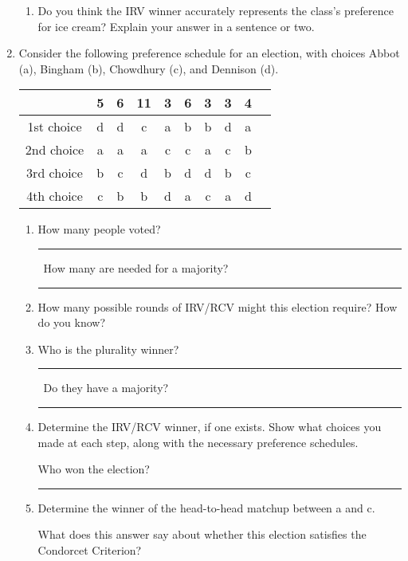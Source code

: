 \documentclass[12pt]{article}
\newcommand{\ans}[1][1in]{\rule{#1}{.5pt}}
\begin{document}
\begin{enumerate}
\begin{enumerate}
\item Do you think the IRV winner accurately represents the class's preference for ice cream? Explain your answer in a sentence or two. \vspace{1in}
\end{enumerate}

\newpage    

\item Consider the following preference schedule for an election, with choices Abbot (a), Bingham (b), Chowdhury (c), and Dennison (d).

\begin{tabular}{|c || c | c | c | c | c | c | c | c | c|}
\hline
			& 5 & 6 & 11 & 3 & 6 & 3 & 3 & 4  \\ \hline
1st choice  & d & d & c  & a & b & b & d & a\\
2nd choice  & a & a & a  & c & c & a & c & b \\
3rd choice  & b & c & d  & b & d & d & b & c\\
4th choice  & c & b & b  & d & a & c & a & d\\
\hline
\end{tabular}

\begin{enumerate}
\item How many people voted? \ans\ How many are needed for a majority? \ans
\item How many possible rounds of IRV/RCV might this election require? How do you know?
\vspace{1cm}
\item Who is the plurality winner? \ans\ Do they have a majority? \ans

\vspace{1cm}

\item Determine the IRV/RCV winner, if one exists. Show what choices you made at each step, along with the necessary preference schedules.

\vfill
Who won the election? \ans[3in]

\bigskip

\item Determine the winner of the head-to-head matchup between a and c. \hrulefill

What does this answer say about whether this election satisfies the Condorcet Criterion? 
\vspace{1in}

\end{enumerate}


\end{enumerate}
\end{document}
